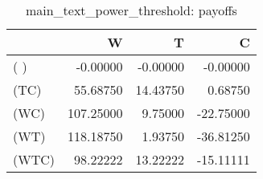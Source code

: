 \begin{table}
\centering
\caption{main_text_power_threshold: payoffs}
\begin{tabular}{lrrr}
\toprule
{} &         W &        T &         C \\
\midrule
( )   &  -0.00000 & -0.00000 &  -0.00000 \\
(TC)  &  55.68750 & 14.43750 &   0.68750 \\
(WC)  & 107.25000 &  9.75000 & -22.75000 \\
(WT)  & 118.18750 &  1.93750 & -36.81250 \\
(WTC) &  98.22222 & 13.22222 & -15.11111 \\
\bottomrule
\end{tabular}
\end{table}
